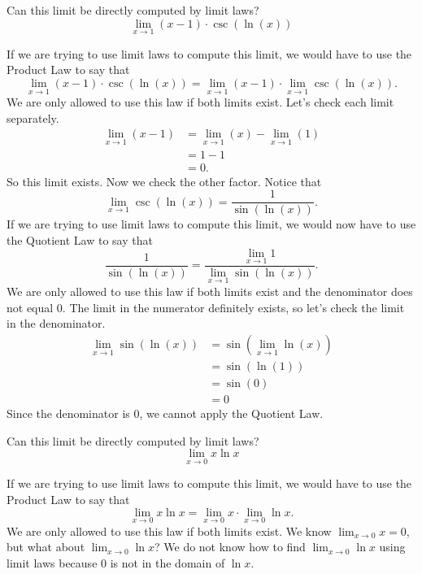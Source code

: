 \documentclass{ximera}
\begin{document}
\begin{question}
  Can this limit be directly computed by limit laws?
  \[
  \lim_{x\to 1}{(x-1)\cdot \csc(\ln(x))}
  \]
  \begin{prompt}
  \begin{multipleChoice}
  \end{multipleChoice}
  \begin{feedback}
    If we are trying to use limit laws to compute this limit, we would have to use the Product Law to say that
    \[
    \lim_{x\to 1}{(x-1)\cdot \csc(\ln(x))}= \lim_{x\to 1}{(x-1)\cdot \lim_{x\to 1}\csc(\ln(x))}.
    \]
    We are only allowed to use this law if both limits exist.  Let's
    check each limit separately.
    \begin{align*}
      \lim_{x\to 1} (x-1) &= \lim_{x\to 1} (x)-\lim_{x\to 1}(1)\\
      &=1-1\\
      &=0.
    \end{align*}
   So this limit exists. Now we check the other factor.
   Notice that
   \[
   \lim_{x\to 1}\csc(\ln(x)) = \frac{1}{\sin(\ln(x))}.
   \]
   If we are trying to use limit laws to compute this limit, we would now have to use the Quotient Law to say that
   \[
   \frac{1}{\sin(\ln(x))} = \frac{\lim_{x\to 1}1}{\lim_{x\to
       1}\sin(\ln(x))}.
   \]
   We are only allowed to use this law if both limits exist and the
   denominator does not equal $0$.  The limit in the numerator definitely
   exists, so let's check the limit in the denominator.
   \begin{align*}
   \lim_{x\to 1}\sin(\ln(x)) &= \sin(\lim_{x\to 1}\ln(x))\\
   &=\sin(\ln(1))\\
   &= \sin(0)\\
   &= 0
  \end{align*}
  Since the denominator is $0$, we cannot apply the Quotient Law.
  \end{feedback}
  \end{prompt}
\end{question}

\begin{question}
  Can this limit be directly computed by limit laws?
  \[
  \lim_{x\to 0} x\ln x
  \]
  \begin{prompt}
  \begin{multipleChoice}
  \end{multipleChoice}
  \begin{feedback}
  If we are trying to use limit laws to compute this limit, we would
  have to use the Product Law to say that
  \[
  \lim_{x\to 0} x\ln x =\lim_{x\to 0} x \cdot \lim_{x\to 0}\ln x.
  \]
  We are only allowed to use this law if both limits exist.  We know
  $\lim_{x\to 0} x = 0$, but what about $\lim_{x\to 0}\ln x$?  We do
  not know how to find $\lim_{x\to 0}\ln x$ using limit laws because $0$
  is not in the domain of $\ln x$.
  \end{feedback}
  \end{prompt}
\end{question}
\end{document}
